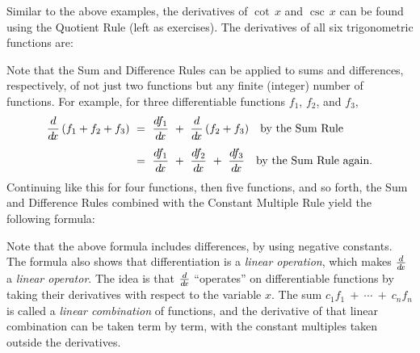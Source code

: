 Similar to the above examples, the derivatives of $\cot\,x$ and $\csc\,x$ can be
found using the Quotient Rule (left as
exercises). The derivatives of all
six trigonometric functions are:


Note that the Sum and Difference Rules can be applied to sums and differences,
respectively, of not just two functions but any finite (integer) number of
functions. For example, for three differentiable functions $f_1$, $f_2$, and
$f_3$,
\begin{align*}
 \ddx\,(f_1 + f_2 + f_3) ~&=~ \frac{\df_1}{\dx} ~+~ \ddx\,(f_2 + f_3) \quad\text{by the Sum Rule}\\[4pt]
 &=~ \frac{\df_1}{\dx} ~+~ \frac{\df_2}{\dx} ~+~ \frac{\df_3}{\dx} \quad\text{by the Sum Rule again.}
\end{align*}
Continuing like this for four functions, then five functions, and so forth, the
Sum and Difference Rules combined with the Constant Multiple Rule yield the
following formula:

Note that the above formula includes differences, by using negative
constants. The formula also shows that differentiation is a
\emph{linear operation}, which makes $\frac{d}{d\!x}$ a
\emph{linear operator}. The idea is that $\frac{d}{d\!x}$
``operates'' on differentiable functions by taking their derivatives with
respect to the variable $x$. The sum $c_1 f_1 ~+~ \cdots ~+~ c_n f_n$ is called
a \emph{linear combination} of functions, and the derivative of that linear
combination can be taken term by term, with the constant multiples taken outside
the derivatives.

